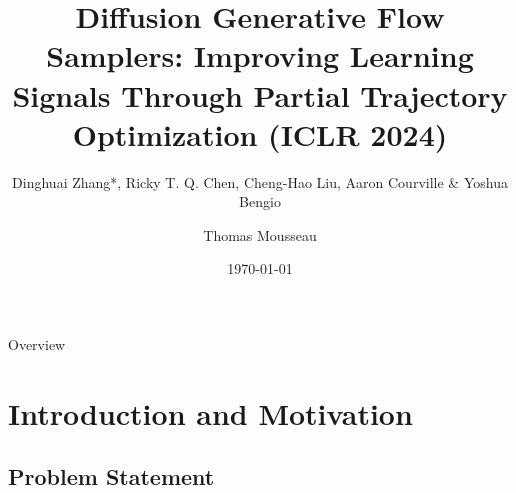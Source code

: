 \documentclass[aspectratio=169,xcolor=dvipsnames]{beamer}
\title{Diffusion Generative Flow Samplers: Improving Learning Signals Through Partial Trajectory Optimization (ICLR 2024)}
\subtitle{Dinghuai Zhang*, Ricky T. Q. Chen, Cheng-Hao Liu, Aaron Courville \& Yoshua Bengio}
\author{Thomas Mousseau}
\date{\today} %
\begin{document}
\begin{frame}
    \vspace*{-2cm}
    \titlepage
\end{frame}

\begin{frame}{Overview}
    \tableofcontents
\end{frame}


\section{Introduction and Motivation}

\subsection{Problem Statement}
\end{document}
